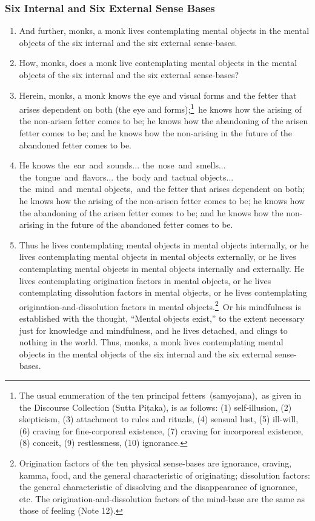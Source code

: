 \documentclass[a4 paper, 12pt]{article}
\begin{document}
\begin{multicols}{2}
\subsubsection*{Six Internal and Six External Sense Bases}
\begin{enumerate}[resume]
\item And further, monks, a monk lives contemplating mental objects in the mental objects of the six internal and the six external sense-bases.
\item How, monks, does a monk live contemplating mental objects in the mental objects of the six internal and the six external sense-bases?
\item Herein, monks, a monk knows the eye and visual forms and the fetter that arises dependent on both (the eye and forms);\footnote{The usual enumeration of the ten principal fetters (samyojana), as given in the Discourse Collection (Sutta Piṭaka), is as follows: (1) self-illusion, (2) skepticism, (3) attachment to rules and rituals, (4) sensual lust, (5) ill-will, (6) craving for fine-corporeal existence, (7) craving for incorporeal existence, (8) conceit, (9) restlessness, (10) ignorance.} he knows how the arising of the non-arisen fetter comes to be; he knows how the abandoning of the arisen fetter comes to be; and he knows how the non-arising in the future of the abandoned fetter comes to be.
\item He knows the ear and sounds... the nose and smells... the tongue and flavors... the body and tactual objects... the mind and mental objects, and the fetter that arises dependent on both; he knows how the arising of the non-arisen fetter comes to be; he knows how the abandoning of the arisen fetter comes to be; and he knows how the non-arising in the future of the abandoned fetter comes to be.
\item Thus he lives contemplating mental objects in mental objects internally, or he lives contemplating mental objects in mental objects externally, or he lives contemplating mental objects in mental objects internally and externally. He lives contemplating origination factors in mental objects, or he lives contemplating dissolution factors in mental objects, or he lives contemplating origination-and-dissolution factors in mental objects.\footnote{Origination factors of the ten physical sense-bases are ignorance, craving, kamma, food, and the general characteristic of originating; dissolution factors: the general characteristic of dissolving and the disappearance of ignorance, etc. The origination-and-dissolution factors of the mind-base are the same as those of feeling (Note 12).} Or his mindfulness is established with the thought, “Mental objects exist,” to the extent necessary just for knowledge and mindfulness, and he lives detached, and clings to nothing in the world. Thus, monks, a monk lives contemplating mental objects in the mental objects of the six internal and the six external sense-bases.

\end{enumerate}
\end{multicols}
\end{document}
